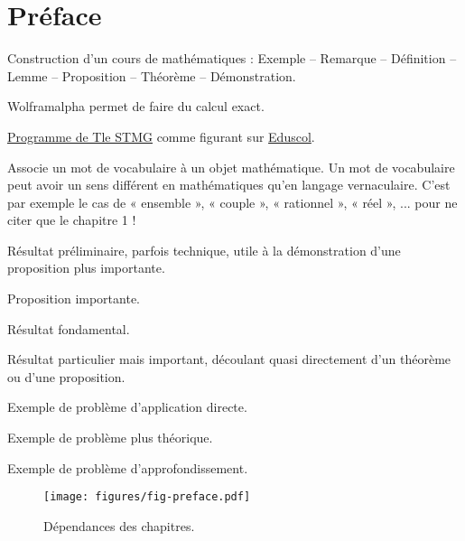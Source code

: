 
\chapter*{Préface}

Construction d'un cours de mathématiques : Exemple -- Remarque -- Définition -- Lemme -- Proposition -- Théorème -- Démonstration.

Wolframalpha permet de faire du calcul exact.

\href{https://eduscol.education.fr/document/24562/download}{Programme de Tle STMG} comme figurant sur
\href{https://eduscol.education.fr/1723/programmes-et-ressources-en-mathematiques-voie-gt}{Eduscol}.

\begin{definition*}
Associe un mot de vocabulaire à un objet mathématique.
Un mot de vocabulaire peut avoir un sens différent en mathématiques qu'en langage vernaculaire.
C'est par exemple le cas de « ensemble », « couple », « rationnel », « réel », ... pour ne citer que le chapitre 1 !
\end{definition*}

\begin{lemme*}
	Résultat préliminaire, parfois technique, utile à la démonstration d'une proposition plus importante.
\end{lemme*}

\begin{proposition*}
	Proposition importante.
\end{proposition*}

\begin{theorem*}
	Résultat fondamental.
\end{theorem*}

\begin{corollaire*}
	Résultat particulier mais important, découlant quasi directement d'un théorème ou d'une proposition.
\end{corollaire*}


\begin{Exercise}[counter=preface]
	Exemple de problème d'application directe.
\end{Exercise}
\begin{Exercise}[difficulty=1, counter=preface]
	Exemple de problème plus théorique.
\end{Exercise}
\begin{Exercise}[difficulty=2, counter=preface]
	Exemple de problème d'approfondissement.
\end{Exercise}


\newpage
\begin{figure}
	\centering
	\texttt{[image: figures/fig-preface.pdf]}
	\caption{Dépendances des chapitres.}
\end{figure}

